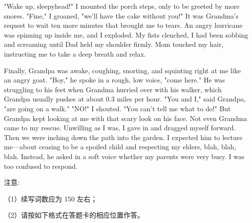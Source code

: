\documentclass{英语试卷}
\begin{document}
\par "Wake up, sleepyhead!" I mounted the porch steps, only to be greeted by more snores. "Fine," I groaned, "we'll have the cake without you!" It was Grandma's request to wait ten more minutes that brought me to tears. An angry hurricane was spinning up inside me, and I exploded. My fists clenched, I had been sobbing and screaming until Dad held my shoulder firmly. Mom touched my hair, instructing me to take a deep breath and relax.\par
\par Finally, Grandpa was awake, coughing, snorting, and squinting right at me like an angry goat. "Boy," he spoke in a rough, low voice, "come here." He was struggling to his feet when Grandma hurried over with his walker, which Grandpa usually pushes at about 0.3 miles per hour. "You and I," said Grandpa, "are going on a walk." "NO!" I shouted. "You can't tell me what to do!" But Grandpa kept looking at me with that scary look on his face. Not even Grandma came to my rescue. Unwilling as I was, I gave in and dragged myself forward. Then we were inching down the path into the garden. I expected him to lecture me—about ceasing to be a spoiled child and respecting my elders, blah, blah, blah. Instead, he asked in a soft voice whether my parents were very busy. I was too confused to respond.\par
\par 注意:\par
\par （1）续写词数应为 150 左右；\par
\par （2）请按如下格式在答题卡的相应位置作答。\par
{}
\end{document}
